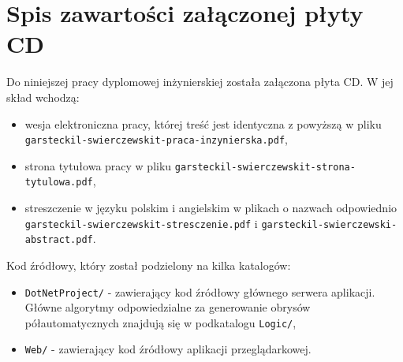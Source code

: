 \documentclass[a4paper,11pt,twoside,openright]{report}
\theoremstyle{definition}
\begin{document}


\listoffigures
{}




\renewcommand{\listtablename}{Spis tabel}
{}
\listoftables


\chapter*{Spis zawartości załączonej płyty CD}

Do niniejszej pracy dyplomowej inżynierskiej została załączona płyta CD. W jej skład wchodzą:
\begin{itemize}[noitemsep]
\item wesja elektroniczna pracy, której treść jest identyczna z powyższą w
pliku \verb+garsteckil-swierczewskit-praca-inzynierska.pdf+,
\item strona tytułowa pracy w pliku \verb+garsteckil-swierczewskit-strona-tytulowa.pdf+,
\item streszczenie w języku polskim i angielskim w plikach o nazwach odpowiednio
\verb+garsteckil-swierczewskit-stresczenie.pdf+ i \verb+garsteckil-swierczewski-abstract.pdf+.
\end{itemize}

Kod źródłowy, który został podzielony na kilka katalogów:
\begin{itemize}
\item \verb+DotNetProject/+ - zawierający kod źródłowy głównego serwera aplikacji.
Główne algorytmy odpowiedzialne za generowanie obrysów półautomatycznych znajdują się w podkatalogu \verb+Logic/+,
\item \verb+Web/+ - zawierający kod źródłowy aplikacji przeglądarkowej.
\end{itemize}

\end{document}

